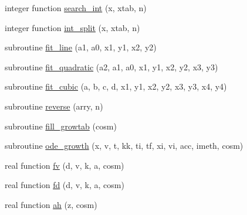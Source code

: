 \begin{DoxyCompactItemize}
\item 
integer function \mbox{\hyperlink{namespacenonlinear_a210b83a28f6523e35c1b2314bd38ba10}{search\+\_\+int}} (x, xtab, n)
\item 
integer function \mbox{\hyperlink{namespacenonlinear_a0241839029c1aa4d429fb9a516577921}{int\+\_\+split}} (x, xtab, n)
\item 
subroutine \mbox{\hyperlink{namespacenonlinear_a5754454991f9dfb61c4251267c2d175d}{fit\+\_\+line}} (a1, a0, x1, y1, x2, y2)
\item 
subroutine \mbox{\hyperlink{namespacenonlinear_ade72d40a60522b6b609687fbe7e9ddbb}{fit\+\_\+quadratic}} (a2, a1, a0, x1, y1, x2, y2, x3, y3)
\item 
subroutine \mbox{\hyperlink{namespacenonlinear_ad34b8f5e3284fe90bf1e2d39ad027cc1}{fit\+\_\+cubic}} (a, b, c, d, x1, y1, x2, y2, x3, y3, x4, y4)
\item 
subroutine \mbox{\hyperlink{namespacenonlinear_ac344cab10a5226c8ef0147ff8f96767a}{reverse}} (arry, n)
\item 
subroutine \mbox{\hyperlink{namespacenonlinear_af9e22f2a04a3c5dc0f45fcd96c9b28cb}{fill\+\_\+growtab}} (cosm)
\item 
subroutine \mbox{\hyperlink{namespacenonlinear_a26b787bf515ef27795b9dbbed39b2e34}{ode\+\_\+growth}} (x, v, t, kk, ti, tf, xi, vi, acc, imeth, cosm)
\item 
real function \mbox{\hyperlink{namespacenonlinear_aa6814235c0bd98fe3c05073b03b16fac}{fv}} (d, v, k, a, cosm)
\item 
real function \mbox{\hyperlink{namespacenonlinear_a7f8c8180d41c0771e383f7edaa516803}{fd}} (d, v, k, a, cosm)
\item 
real function \mbox{\hyperlink{namespacenonlinear_ab5e5d4cd8639004a33671b83480474cd}{ah}} (z, cosm)
\end{DoxyCompactItemize}
